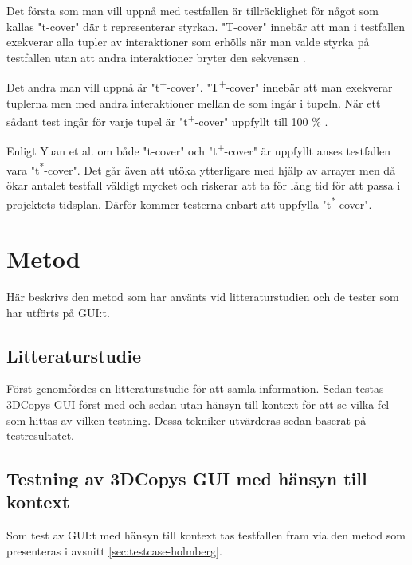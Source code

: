 Det första som man vill uppnå med testfallen är tillräcklighet för något som kallas "t-cover" där t representerar styrkan. "T-cover" innebär att man i testfallen exekverar alla tupler av interaktioner som erhölls när man valde styrka på testfallen utan att andra interaktioner bryter den sekvensen \cite{yuan2011gui}.

Det andra man vill uppnå är "t\textsuperscript{+}-cover". "T\textsuperscript{+}-cover" innebär att man exekverar tuplerna men med andra interaktioner mellan de som ingår i tupeln. När ett sådant test ingår för varje tupel är "t\textsuperscript{+}-cover" uppfyllt till 100 \% \cite{yuan2011gui}.

Enligt Yuan et al. \cite{yuan2011gui} om både "t-cover" och "t\textsuperscript{+}-cover" är uppfyllt anses testfallen vara "t\textsuperscript{*}-cover". Det går även att utöka ytterligare med hjälp av arrayer men då ökar antalet testfall väldigt mycket och riskerar att ta för lång tid för att passa i projektets tidsplan. Därför kommer testerna enbart att uppfylla "t\textsuperscript{*}-cover".

\section{Metod}
\label{sec:method-holmberg}

Här beskrivs den metod som har använts vid litteraturstudien och de tester som har utförts på GUI:t.

\subsection{Litteraturstudie}

Först genomfördes en litteraturstudie för att samla information. Sedan testas 3DCopys GUI först med och sedan utan hänsyn till kontext för att se vilka fel som hittas av vilken testning. Dessa tekniker utvärderas sedan baserat på testresultatet.

\subsection{Testning av 3DCopys GUI med hänsyn till kontext}

Som test av GUI:t med hänsyn till kontext tas testfallen fram via den metod som presenteras i avsnitt \ref{sec:testcase-holmberg}.

